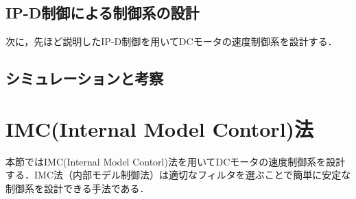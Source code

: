 \documentclass[a4paper,12pt]{jarticle}
\begin{document}
\subsection{IP-D制御による制御系の設計}
次に，先ほど説明したIP-D制御を用いてDCモータの速度制御系を設計する．

\subsection{シミュレーションと考察}


\section{IMC(Internal Model Contorl)法}
本節ではIMC(Internal Model Contorl)法を用いてDCモータの速度制御系を設計
する．IMC法（内部モデル制御法）は適切なフィルタを選ぶことで簡単に安定な
制御系を設計できる手法である．
\end{document}
